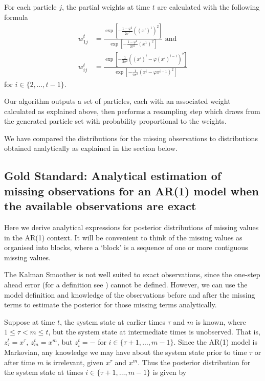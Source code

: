 For each particle $j$, the partial weights at time $t$ are calculated with the following formula
\begin{align} \label{eq:w1}
    w_{1j}^t &= \frac{\exp \left[ -\frac{1 - \varphi^2}{2 \sigma^2}{((x')^1)^2} \right]}{\exp \left[ -\frac{1 - \varphi^2}{2 \sigma^2}{(x^1)^2} \right]} \mbox{ and } \\ 
    w_{ij}^t &= \frac{\exp \left[ -\frac{1}{2 \sigma^2}{((x')^i - \varphi (x')^{i-1})^2} \right]}{\exp \left[ -\frac{1}{2 \sigma^2}{(x^i - \varphi x^{i-1})^2} \right]} \label{eq:w2}
\end{align}
for $i \in \{ 2, \ldots, t-1 \}$.

Our algorithm outputs a set of particles, each with an associated weight calculated as explained above, then performs a resampling step which draws from the generated particle set with probability proportional to the weights.

We have compared the distributions for the missing observations to distributions obtained analytically as explained in the section below.

\subsection{Gold Standard: Analytical estimation of missing observations for an AR(1) model when the available observations are exact}
\label{sec:6}

Here we derive analytical expressions for posterior distributions of missing values in the AR(1) context. It will be convenient to think of the missing values as organised into blocks, where a `block' is a sequence of one or more contiguous missing values.

The Kalman Smoother is not well suited to exact observations, since the one-step ahead error (for a definition see \cite{Young}) cannot be defined. However, we can use the model definition and knowledge of the observations before and after the missing terms to estimate the posterior for those missing terms analytically.

Suppose at time $t$, the system state at earlier times $\tau$ and $m$ is known, where $1 \leq \tau < m \leq t$, but the system state at intermediate times is unobserved. That is, $z^t_{\tau} = x^{\tau}$, $z^t_{m} = x^m$, but $z^t_i = -$ for $i \in \{ \tau+1, \ldots, m-1\}$. Since the AR(1) model is Markovian, any knowledge we may have about the system state prior to time $\tau$ or after time $m$ is irrelevant, given $x^{\tau}$ and $x^{m}$. Thus the posterior distribution for the system state at times $i \in \{ \tau+1, \ldots, m-1\}$ is given by

